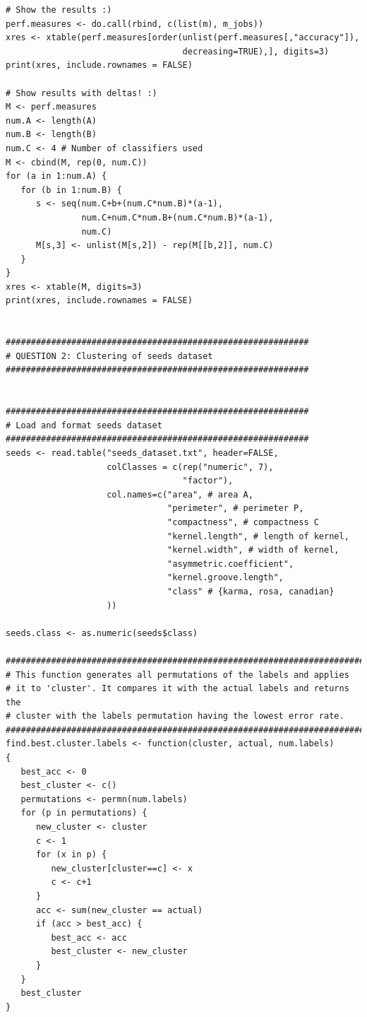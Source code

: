 \documentclass[12pt,article,oneside]{memoir}
\begin{document}
\begin{verbatim}
# Show the results :)
perf.measures <- do.call(rbind, c(list(m), m_jobs))
xres <- xtable(perf.measures[order(unlist(perf.measures[,"accuracy"]),
                                   decreasing=TRUE),], digits=3)
print(xres, include.rownames = FALSE)

# Show results with deltas! :)
M <- perf.measures
num.A <- length(A)
num.B <- length(B)
num.C <- 4 # Number of classifiers used
M <- cbind(M, rep(0, num.C))
for (a in 1:num.A) {
   for (b in 1:num.B) {
      s <- seq(num.C+b+(num.C*num.B)*(a-1),
               num.C+num.C*num.B+(num.C*num.B)*(a-1),
               num.C)
      M[s,3] <- unlist(M[s,2]) - rep(M[[b,2]], num.C)
   }
}
xres <- xtable(M, digits=3)
print(xres, include.rownames = FALSE)


############################################################
# QUESTION 2: Clustering of seeds dataset
############################################################


############################################################
# Load and format seeds dataset
############################################################
seeds <- read.table("seeds_dataset.txt", header=FALSE,
                    colClasses = c(rep("numeric", 7),
                                   "factor"),
                    col.names=c("area", # area A,
                                "perimeter", # perimeter P,
                                "compactness", # compactness C 
                                "kernel.length", # length of kernel, 
                                "kernel.width", # width of kernel, 
                                "asymmetric.coefficient",
                                "kernel.groove.length",
                                "class" # {karma, rosa, canadian}
                    ))

seeds.class <- as.numeric(seeds$class)

#########################################################################
# This function generates all permutations of the labels and applies
# it to 'cluster'. It compares it with the actual labels and returns the
# cluster with the labels permutation having the lowest error rate.
#########################################################################
find.best.cluster.labels <- function(cluster, actual, num.labels)
{
   best_acc <- 0
   best_cluster <- c()
   permutations <- permn(num.labels)
   for (p in permutations) {
      new_cluster <- cluster
      c <- 1
      for (x in p) {
         new_cluster[cluster==c] <- x
         c <- c+1
      }
      acc <- sum(new_cluster == actual)
      if (acc > best_acc) {
         best_acc <- acc
         best_cluster <- new_cluster
      }
   }
   best_cluster
}


\end{verbatim}
\end{document}
